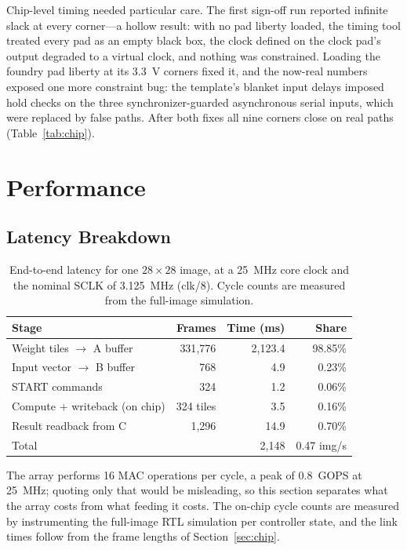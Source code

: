 \documentclass[conference,a4paper]{APSIPA2026}
\begin{document}
Chip-level timing needed particular care. The first sign-off run reported infinite slack at every corner---a hollow result: with no pad liberty loaded, the timing tool treated every pad as an empty black box, the clock defined on the clock pad's output degraded to a virtual clock, and nothing was constrained. Loading the foundry pad liberty at its 3.3~V corners fixed it, and the now-real numbers exposed one more constraint bug: the template's blanket input delays imposed hold checks on the three synchronizer-guarded asynchronous serial inputs, which were replaced by false paths. After both fixes all nine corners close on real paths (Table~\ref{tab:chip}).

\clearpage
\section{Performance}\label{sec:perf}

\subsection{Latency Breakdown}

\begin{table}[!ht]
\caption{End-to-end latency for one $28\times28$ image, at a 25~MHz core clock and the nominal SCLK of 3.125~MHz (clk/8). Cycle counts are measured from the full-image simulation.}
\label{tab:latency}
\centering
\renewcommand{\arraystretch}{1.08}
\begin{tabular}{@{}lrrr@{}}
\toprule
Stage & Frames & Time (ms) & Share \\
\midrule
Weight tiles $\rightarrow$ A buffer & 331{,}776 & 2{,}123.4 & 98.85\% \\
Input vector $\rightarrow$ B buffer & 768       & 4.9       & 0.23\% \\
START commands                      & 324       & 1.2       & 0.06\% \\
Compute + writeback (on chip)       & 324 tiles & 3.5       & 0.16\% \\
Result readback from C              & 1{,}296   & 14.9      & 0.70\% \\
\midrule
Total                               &           & 2{,}148   & 0.47 img/s \\
\bottomrule
\end{tabular}
\end{table}
The array performs 16 MAC operations per cycle, a peak of 0.8~GOPS at 25~MHz; quoting only that would be misleading, so this section separates what the array costs from what feeding it costs. The on-chip cycle counts are measured by instrumenting the full-image RTL simulation per controller state, and the link times follow from the frame lengths of Section~\ref{sec:chip}.
\end{document}
